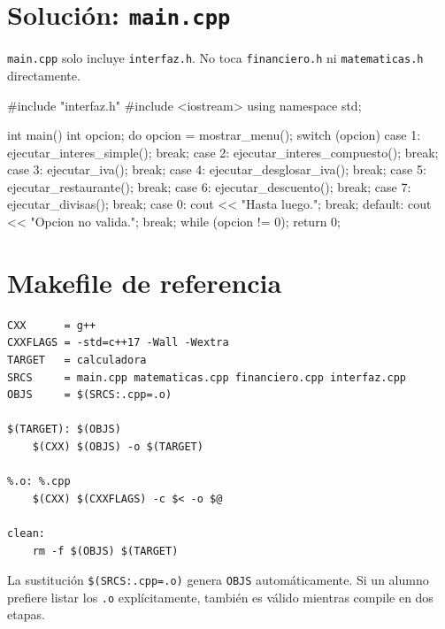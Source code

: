 \documentclass[12pt, oneside]{article}
\begin{document}
\section{Solución: \texttt{main.cpp}}

\begin{notaprofesor}
  \texttt{main.cpp} solo incluye \texttt{interfaz.h}.  No toca
  \texttt{financiero.h} ni \texttt{matematicas.h} directamente.

\begin{codigo}
#include "interfaz.h"
#include <iostream>
using namespace std;

int main() {
    int opcion;
    do {
        opcion = mostrar_menu();
        switch (opcion) {
            case 1: ejecutar_interes_simple();    break;
            case 2: ejecutar_interes_compuesto(); break;
            case 3: ejecutar_iva();               break;
            case 4: ejecutar_desglosar_iva();     break;
            case 5: ejecutar_restaurante();       break;
            case 6: ejecutar_descuento();         break;
            case 7: ejecutar_divisas();           break;
            case 0: cout << "Hasta luego.\n";     break;
            default: cout << "Opcion no valida.\n"; break;
        }
    } while (opcion != 0);
    return 0;
}
\end{codigo}
\end{notaprofesor}

\section{Makefile de referencia}
\label{sec:makefile}

\begin{notaprofesor}
\begin{verbatim}
CXX      = g++
CXXFLAGS = -std=c++17 -Wall -Wextra
TARGET   = calculadora
SRCS     = main.cpp matematicas.cpp financiero.cpp interfaz.cpp
OBJS     = $(SRCS:.cpp=.o)

$(TARGET): $(OBJS)
	$(CXX) $(OBJS) -o $(TARGET)

%.o: %.cpp
	$(CXX) $(CXXFLAGS) -c $< -o $@

clean:
	rm -f $(OBJS) $(TARGET)
\end{verbatim}

  La sustitución \texttt{\$(SRCS:.cpp=.o)} genera \texttt{OBJS}
  automáticamente.  Si un alumno prefiere listar los \texttt{.o}
  explícitamente, también es válido mientras compile en dos etapas.
\end{notaprofesor}
\end{document}

